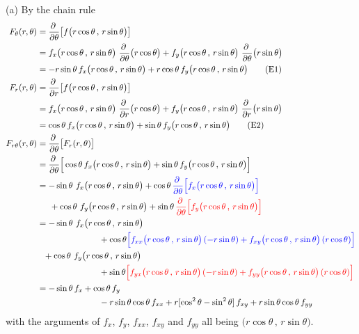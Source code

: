 \begin{solution}
(a) By the chain rule
\begin{align*}
F_\theta(r,\theta)
&=\pdiff{}{\theta}\big[f\big(r\cos\theta\,,\,r\sin\theta\big)\big] \\
&= f_x\big(r\cos\theta\,,\,r\sin\theta\big)
           \ \pdiff{}{\theta}\big(r\cos\theta\big)
  +f_y\big(r\cos\theta\,,\,r\sin\theta\big)
           \ \pdiff{}{\theta}\big(r\sin\theta\big)
   \\
&=-r\sin\theta\, f_x\big(r\cos\theta\,,\,r\sin\theta\big)
  +r\cos\theta\, f_y\big(r\cos\theta\,,\,r\sin\theta\big) 
\tag{E1}\\ %
F_r(r,\theta)
&=\pdiff{}{r}\big[f\big(r\cos\theta\,,\,r\sin\theta\big)\big] \\
&= f_x\big(r\cos\theta\,,\,r\sin\theta\big)
           \ \pdiff{}{r}\big(r\cos\theta\big)
  +f_y\big(r\cos\theta\,,\,r\sin\theta\big)
           \ \pdiff{}{r}\big(r\sin\theta\big)
   \\
&= \cos\theta\, f_x\big(r\cos\theta\,,\,r\sin\theta\big)
  +\sin\theta\, f_y\big(r\cos\theta\,,\,r\sin\theta\big) 
\tag{E2}\\ %
F_{r\theta}(r,\theta) &= \pdiff{}{\theta}\big[F_r(r,\theta)\big] \\
&=\pdiff{}{\theta}\Big[\cos\theta\, f_x\big(r\cos\theta\,,\,r\sin\theta\big)
  +\sin\theta\, f_y\big(r\cos\theta\,,\,r\sin\theta\big)\Big] \\
&=-\sin\theta\  f_x\big(r\cos\theta\,,\,r\sin\theta\big)
  +\cos\theta\, \textcolor{blue}{
          \pdiff{}{\theta} \Big[f_x\big(r\cos\theta\,,\,r\sin\theta\big)\Big]}
   \\&\hskip0.2in
  +\cos\theta\  f_y\big(r\cos\theta\,,\,r\sin\theta\big)
  +\sin\theta\,  \textcolor{red}{ 
       \pdiff{}{\theta}\Big[f_y\big(r\cos\theta\,,\,r\sin\theta\big)\Big]} \\
&=-\sin\theta\  f_x\big(r\cos\theta\,,\,r\sin\theta\big) \\&\hskip1in
    +\cos\theta \textcolor{blue}{
          \Big[f_{xx}\big(r\cos\theta\,,\,r\sin\theta\big)\,(-r\sin\theta)
              +f_{xy}\big(r\cos\theta\,,\,r\sin\theta\big)\,(r\cos\theta)\Big]}
          \\&\hskip0.1in
  +\cos\theta\  f_y\big(r\cos\theta\,,\,r\sin\theta\big) \\&\hskip1in
    +\sin\theta \textcolor{red}{
          \Big[f_{yx}\big(r\cos\theta\,,\,r\sin\theta\big)\,(-r\sin\theta)
              +f_{yy}\big(r\cos\theta\,,\,r\sin\theta\big)\,(r\cos\theta)\Big]}
          \\
&=-\sin\theta\, f_x
  +\cos\theta\, f_y \\&\hskip1in
  -r\sin\theta\cos\theta\, f_{xx}
  +r[\cos^2\theta-\sin^2\theta]\, f_{xy}
  +r\sin\theta\cos\theta\, f_{yy}
\end{align*}
with the arguments of $f_x$, $f_y$, $f_{xx}$, $f_{xy}$ and $f_{yy}$
all being $\big(r\cos\theta\,,\,r\sin\theta\big)$.


\end{solution}

